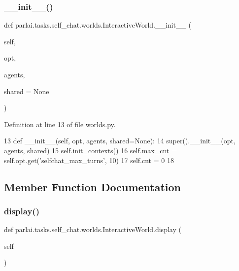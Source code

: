 \subsubsection{\texorpdfstring{\+\_\+\+\_\+init\+\_\+\+\_\+()}{\_\_init\_\_()}}
{\footnotesize\ttfamily def parlai.\+tasks.\+self\+\_\+chat.\+worlds.\+Interactive\+World.\+\_\+\+\_\+init\+\_\+\+\_\+ (\begin{DoxyParamCaption}\item[{}]{self,  }\item[{}]{opt,  }\item[{}]{agents,  }\item[{}]{shared = {\ttfamily None} }\end{DoxyParamCaption})}



Definition at line 13 of file worlds.\+py.


\begin{DoxyCode}
13     \textcolor{keyword}{def }\_\_init\_\_(self, opt, agents, shared=None):
14         super().\_\_init\_\_(opt, agents, shared)
15         self.init\_contexts()
16         self.max\_cnt = self.opt.get(\textcolor{stringliteral}{'selfchat\_max\_turns'}, 10)
17         self.cnt = 0
18 
\end{DoxyCode}


\subsection{Member Function Documentation}
\mbox{\label{classparlai_1_1tasks_1_1self__chat_1_1worlds_1_1InteractiveWorld_aa9b72efe99c4deac0224d4afcdb84ebc}} 
\subsubsection{\texorpdfstring{display()}{display()}}
{\footnotesize\ttfamily def parlai.\+tasks.\+self\+\_\+chat.\+worlds.\+Interactive\+World.\+display (\begin{DoxyParamCaption}\item[{}]{self }\end{DoxyParamCaption})}



